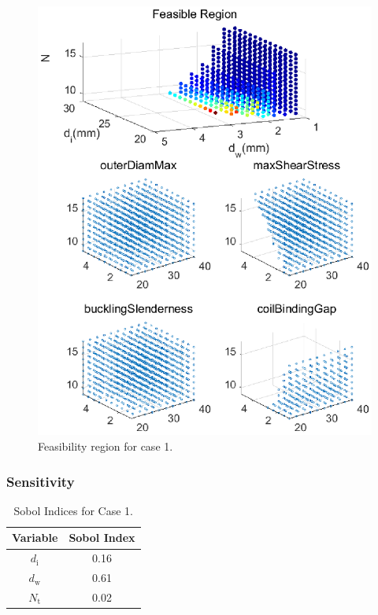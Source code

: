 \documentclass[10pt]{article}
\begin{document}
			\begin{figure}[H]
		 \begin{center}\includegraphics[scale=.5]{Case_56_38910new.eps}\end{center}
		 \caption{Feasibility region for case 1.}
		 \label{Feasibility region for case 1.}
		 \end{figure}

	
	\subsubsection{Sensitivity}
	
	 \begin{table}[H]
	\caption{Sobol Indices for Case 1.}
	 \centering
	 	\begin{tabular}{c  c}
			\hline \hline
	 		Variable & Sobol Index\\
			\hline
	 		 $d_{\text{i}}$ & 0.16 \\
			 $d_{\text{w}}$ & 0.61  \\
			 $N_{\text{t}}$ & 0.02 \\ 
			\hline \hline
		\end{tabular}
	 \end{table}
\end{document}
